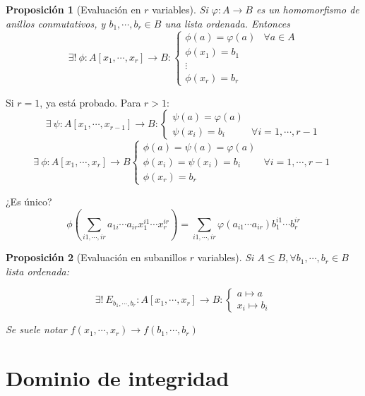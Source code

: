 \documentclass[11pt, a4paper, titlepage]{article}
\makeatletter
\renewenvironment{proof}[1][\proofname] {\vspace{-15pt}\par\pushQED{\qed}\normalfont\topsep6\p@\@plus6\p@\relax\trivlist\item[\hskip\labelsep\it#1\@addpunct{.}]\ignorespaces}{\popQED\endtrivlist\@endpefalse}
\theoremstyle{theorem-style}
\newtheorem*{nprop}{Proposición}
\theoremstyle{definition-style}
\theoremstyle{remark-style}
\theoremstyle{example-style}
\makeatother
\begin{document}
\begin{nprop}[Evaluación en $r$ variables]
  Si $\varphi : A \longrightarrow B$ es un homomorfismo de anillos conmutativos, y $b_1,\cdots, b_r \in B$ una lista ordenada. Entonces
  \[
    \exists!\ \phi : A[x_1,\cdots,x_r] \longrightarrow B :\begin{cases}
      \phi(a) = \varphi(a) & \forall a\in A\\
      \phi(x_1) = b_1\\
      \vdots\\
      \phi(x_r) = b_r
    \end{cases}
  \]
\end{nprop}

\begin{proof}
  Si $r=1$, ya está probado. Para $r>1$:
  \[
    \exists\ \psi : A[x_1,\cdots,x_{r-1}] \longrightarrow B : \begin{cases}
      \psi(a) = \varphi(a)\\
      \psi(x_i) = b_i & \forall i=1,\cdots,r-1
    \end{cases}
  \]
  \[  \exists\ \phi : A[x_1,\cdots,x_r] \longrightarrow B \begin{cases}
      \phi(a) = \psi(a) = \varphi(a)\\
      \phi(x_i) = \psi(x_i) = b_i &\forall i=1,\cdots,r-1\\
      \phi(x_r) = b_r
    \end{cases}
  \]
  
  ¿Es único?
  \[
    \phi\left(\sum_{i1,\cdots,ir} a_{1i}\cdots a_{ir}x_1^{i1}\cdots x_r^{ir} \right)= \sum _{i1,\cdots,ir} \varphi(a_{i1}\cdots a_{ir})b_1^{i1}\cdots b_r^{ir}
  \]
\end{proof}

\begin{nprop}[Evaluación en subanillos $r$ variables]
	Si $A\leq B, \forall b_1,\cdots,b_r \in B$ lista ordenada:
	
\[
\exists !\ E_{b_1,\cdots,b_r}: A[x_1,\cdots,x_r] \to B :
\begin{cases}
	a \mapsto a\\
	x_i \mapsto b_i
\end{cases}
\]

Se suele notar $f(x_1,\cdots,x_r) \to f(b_1,\cdots,b_r)$
\end{nprop}

\section{Dominio de integridad}
\end{document}
